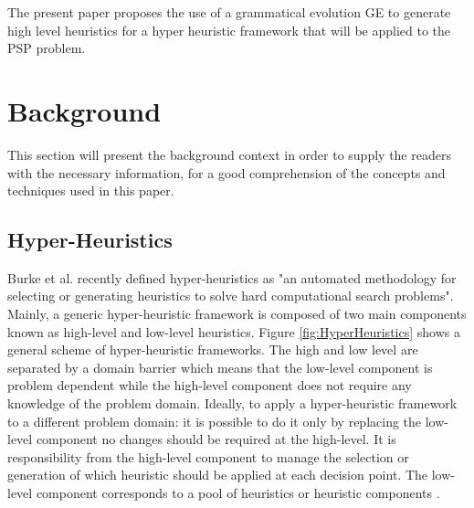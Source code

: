 \documentclass[conference]{IEEEtran}
\begin{document}
The present paper proposes the use of a grammatical evolution GE to generate high level heuristics for a hyper heuristic framework that will be applied to the PSP problem.
\section{Background}
\label{sec:background}

This section will present the background context in order to supply the readers with the necessary information, for a good comprehension of the concepts and techniques used in this paper.  


\subsection{Hyper-Heuristics}
\label{subsec:hyperheuristics}


 Burke et al. \cite{burke2010classification} recently defined hyper-heuristics as "an automated methodology for selecting or generating heuristics to solve hard computational search problems". Mainly, a generic hyper-heuristic framework is composed of two main components known as high-level and low-level heuristics. Figure \ref{fig:HyperHeuristics} shows a general scheme of hyper-heuristic frameworks. The high and low level are separated by a domain barrier which means that the low-level component is problem dependent while the high-level component does not require any knowledge of the problem domain. Ideally, to apply a hyper-heuristic framework to a different problem domain: it is possible to do it only by replacing  the low-level component no changes should be required at the high-level. It is responsibility from the high-level component to manage the selection or generation of which heuristic should be applied at each decision point. The low-level component corresponds to a pool of heuristics or heuristic components \cite{sabar2015automatic}. 
 
\end{document}
